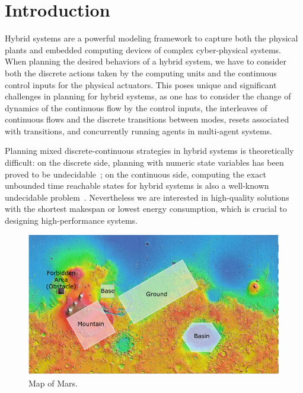 \documentclass[sigconf]{acmart}
\begin{document}



\maketitle

\section{Introduction}

Hybrid systems are a powerful modeling framework to capture both the physical plants and embedded computing devices of complex cyber-physical systems. When planning the desired behaviors of a hybrid system, we have to consider both the discrete actions taken by the computing units and the continuous control inputs for the physical actuators. This poses unique and significant challenges in planning for hybrid systems, as one has to consider the change of dynamics of the continuous flow by the control inputs, the interleaves of continuous flows and the discrete transitions between modes, resets associated with transitions, and concurrently running agents in multi-agent systems. 

Planning mixed discrete-continuous strategies in hybrid systems is theoretically difficult: on the discrete side, planning with numeric state variables has been proved to be undecidable~\cite{helmert2002decidability}; on the continuous side, computing the exact unbounded time reachable states for hybrid systems is also a well-known undecidable problem~\cite{henzinger1998s}. Nevertheless we are interested in high-quality solutions with the shortest makespan or lowest energy consumption, which is crucial to designing high-performance systems.

\begin{figure}[t]
\centering
\includegraphics[width=0.95\columnwidth]{images/mars.pdf}
\caption{\small Map of Mars.}
\label{fig:mars}
\end{figure} 
\end{document}

